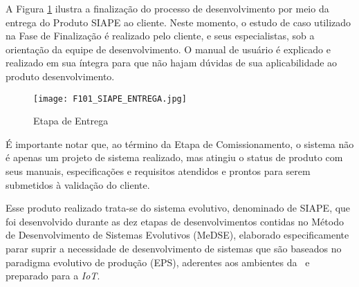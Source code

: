 
A Figura \ref{F101} ilustra a finalização do processo de desenvolvimento por meio da entrega do Produto SIAPE ao cliente. Neste momento, o estudo de caso utilizado na Fase de Finalização é realizado pelo cliente, e seus especialistas, sob a orientação da equipe de desenvolvimento. O manual de usuário é explicado e realizado em sua íntegra para que não hajam dúvidas de sua aplicabilidade ao produto desenvolvimento.  

\begin{figure}[h]
	\centering
	\texttt{[image: F101\_SIAPE\_ENTREGA.jpg]} 
	\caption{Etapa de Entrega}
	\label{F101}
\end{figure}

É importante notar que, ao término da Etapa de Comissionamento, o sistema não é apenas um projeto de sistema realizado, mas atingiu o status de produto com seus manuais, especificações e requisitos atendidos e prontos para serem submetidos à validação do cliente. 

Esse produto realizado trata-se do sistema evolutivo, denominado de SIAPE, que foi desenvolvido durante as dez etapas de desenvolvimentos contidas no Método de Desenvolvimento de Sistemas Evolutivos (MeDSE), elaborado especificamente parar suprir a necessidade de desenvolvimento de sistemas que são baseados no paradigma evolutivo de produção (EPS), aderentes aos ambientes da \iQuatroZero~e preparado para a \textit{IoT}.



